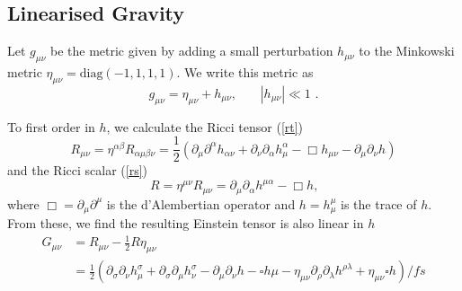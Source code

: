\documentclass[11pt]{cuthesis}
\newcommand{\mn}{_{\mu\nu}}
\newcommand{\pd}{\partial}
\begin{document}
\subsection{Linearised Gravity}
Let $g\mn$ be the metric given by adding a small perturbation $h_{\mu\nu}$ to the Minkowski metric $\eta\mn=\text{diag}(-1,1,1,1)$. We write this metric as 
\begin{equation} \label{pert metric}
g\mn=\eta_{\mu\nu}+h_{\mu\nu} \text{, } \hspace{20pt} |h_{\mu\nu}| \ll 1 \text{ .}
\end{equation}

To first order in $h$, we calculate the Ricci tensor (\ref{rt})
\begin{equation} \label{lin rt}
R\mn =\eta^{\alpha \beta}R_{\alpha \mu \beta \nu} = \frac{1}{2}\left( \pd_\mu \pd ^\alpha h_{\alpha \nu} + \pd_\nu \pd_\alpha h^\alpha_\mu -\Box h\mn -\pd_\mu \pd_\nu h \right)
\end{equation}
and the Ricci scalar (\ref{rs}) 
\begin{equation} \label{lin rs}
R=\eta^{\mu \nu}R\mn=\pd _\mu \pd_ \alpha h^{\mu \alpha} - \Box h \textbf{,}
\end{equation}
where $\Box=\pd_\mu \pd^\mu $ is the d'Alembertian operator and $h=h^\mu_\mu$ is the trace of $h$. From these, we find the resulting Einstein tensor is also linear in $h$ 
\begin{equation} \label{lin Einstein}
\begin{split}
G\mn & =R\mn -\frac{1}{2} R \eta\mn \\
 & = \frac{1}{2} ( \partial_\sigma \partial_\nu h^\sigma_\mu + \partial_\sigma \partial_\mu h^\sigma_\nu - \partial_\mu \partial_\nu h - \square h\mu -\eta\mn \partial_\rho \partial_\lambda h^{\rho \lambda} + \eta\mn \square h ) /fs
\end{split}
\end{equation}
\end{document}
